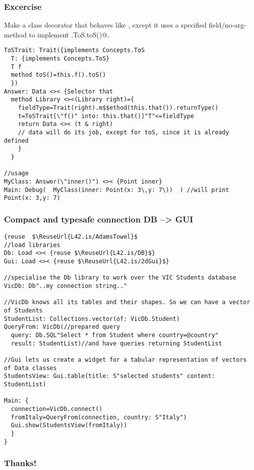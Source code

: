 \begin{frame}[fragile]
\frametitle{Excercise}
Make a class decorator that behaves like \Q@Data@, except it
uses a specified field/no-arg-method to implement \Q@Concepts.ToS.toS()@.
\begin{NiceCode}{59ex}{0.7}
\begin{lstlisting}
ToSTrait: Trait({implements Concepts.ToS
  T: {implements Concepts.ToS}
  T f
  method toS()=this.f().toS()
  })
Answer: Data <>< {Selector that
  method Library <><(Library right)={
    fieldType=Trait(right).m$$ethod(this.that()).returnType()
    t=ToSTrait[\"f()" into: this.that()]"T"<=fieldType
    return Data <>< (t & right) 
    // data will do its job, except for toS, since it is already defined
    }
  }

//usage
MyClass: Answer(\"inner()") <>< {Point inner}
Main: Debug(  MyClass(inner: Point(x: 3\,y: 7\))  ) //will print Point(x: 3,y: 7)
\end{lstlisting}
\end{NiceCode}
\end{frame}


\begin{frame}[fragile]
\frametitle{Compact and typesafe connection DB --> GUI}
\begin{NiceCode}{59ex}{0.7}
\begin{lstlisting}
{reuse  $\ReuseUrl{L42.is/AdamsTowel}$
//load libraries
Db: Load <>< {reuse $\ReuseUrl{L42.is/DB}$}
Gui: Load <>< {reuse $\ReuseUrl{L42.is/2dGui}$}

//specialise the Db library to work over the VIC Students database
VicDb: Db"..my connection string.."

//VicDb knows all its tables and their shapes. So we can have a vector of Students
StudentList: Collections.vector(of: VicDb.Student)
QueryFrom: VicDb(//prepared query
  query: Db.SQL"Select * from Student where country=@country"
  result: StudentList)//and have queries returning StudentList

//Gui lets us create a widget for a tabular representation of vectors of Data classes
StudentsView: Gui.table(title: S"selected students" content: StudentList)

Main: {
  connection=VicDb.connect()
  fromItaly=QueryFrom(connection, country: S"Italy")
  Gui.show(StudentsView(fromItaly))
  }
}
\end{lstlisting}
\end{NiceCode}
\end{frame}



\begin{frame}[fragile]
\frametitle{ Thanks! }
\end{frame}

